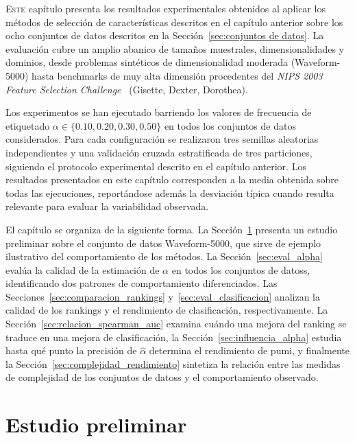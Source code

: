 \lettrine{E}{ste} capítulo presenta los resultados experimentales obtenidos al aplicar los métodos de selección de características descritos en el capítulo anterior sobre los ocho conjuntos de datos descritos en la Sección~\ref{sec:conjuntos de datos}. La evaluación cubre un amplio abanico de tamaños muestrales, dimensionalidades y dominios, desde problemas sintéticos de dimensionalidad moderada (Waveform-5000) hasta benchmarks de muy alta dimensión procedentes del \textit{NIPS 2003 Feature Selection Challenge}~\cite{guyon2004result} (Gisette, Dexter, Dorothea).

Los experimentos se han ejecutado barriendo los valores de frecuencia de etiquetado $\alpha\in\{0.10,0.20,0.30,0.50\}$ en todos los conjuntos de datos considerados. Para cada configuración se realizaron tres semillas aleatorias independientes y una validación cruzada estratificada de tres particiones, siguiendo el protocolo experimental descrito en el capítulo anterior. Los resultados presentados en este capítulo corresponden a la media obtenida sobre todas las ejecuciones, reportándose además la desviación típica cuando resulta relevante para evaluar la variabilidad observada.

El capítulo se organiza de la siguiente forma. La Sección~\ref{sec:estudio_preliminar} presenta un estudio preliminar sobre el conjunto de datos Waveform-5000, que sirve de ejemplo ilustrativo del comportamiento de los métodos. La Sección~\ref{sec:eval_alpha} evalúa la calidad de la estimación de $\alpha$ en todos los conjuntos de datoss, identificando dos patrones de comportamiento diferenciados. Las Secciones~\ref{sec:comparacion_rankings} y~\ref{sec:eval_clasificacion} analizan la calidad de los rankings y el rendimiento de clasificación, respectivamente. La Sección~\ref{sec:relacion_spearman_auc} examina cuándo una mejora del ranking se traduce en una mejora de clasificación, la Sección~\ref{sec:influencia_alpha} estudia hasta qué punto la precisión de $\hat\alpha$ determina el rendimiento de \acrshort{pumi}, y finalmente la Sección~\ref{sec:complejidad_rendimiento} sintetiza la relación entre las medidas de complejidad de los conjuntos de datoss y el comportamiento observado.

\section{Estudio preliminar}
\label{sec:estudio_preliminar}

